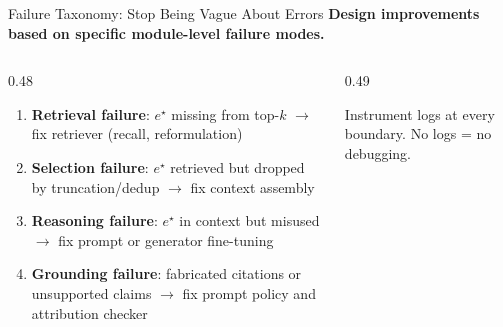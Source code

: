 \documentclass[aspectratio=169, xcolor=table]{beamer}
\begin{document}
\begin{frame}[shrink=15]{Failure Taxonomy: Stop Being Vague About Errors}
\textbf{Design improvements based on specific module-level failure modes.}

\vspace{0.7em}
\begin{columns}[T]
\begin{column}{0.48\textwidth}
\begin{enumerate}
  \item \textbf{Retrieval failure}: $e^\star$ missing from top-$k$
        $\to$ fix retriever (recall, reformulation)
  \item \textbf{Selection failure}: $e^\star$ retrieved but dropped by truncation/dedup
        $\to$ fix context assembly
  \item \textbf{Reasoning failure}: $e^\star$ in context but misused
        $\to$ fix prompt or generator fine-tuning
  \item \textbf{Grounding failure}: fabricated citations or unsupported claims
        $\to$ fix prompt policy and attribution checker
\end{enumerate}
\end{column}
\begin{column}{0.49\textwidth}
\begin{center}
\resizebox{0.95\textwidth}{!}{

}
\end{center}
\begin{block}{}
\footnotesize
Instrument logs at every boundary. No logs = no debugging.
\end{block}
\end{column}
\end{columns}
\end{frame}

\end{document}
